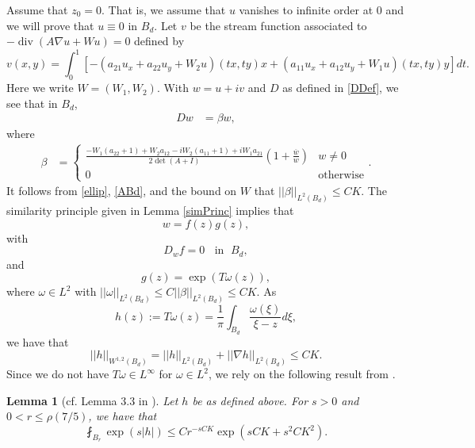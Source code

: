 \documentclass[12pt,reqno]{amsart}
\theoremstyle{plain}
\newtheorem{lem}{Lemma}
\theoremstyle{definition}
\DeclareMathOperator{\di}{div}
\newcommand{\be}{\beta}
\newcommand{\om}{\omega}
\newcommand{\iny}{\infty}
\newcommand{\gr}{\nabla}
\newcommand{\norm}[1]{\left\vert \left\vert #1\right\vert\right\vert}
\newcommand{\brac}[1]{\left[#1\right]}
\newcommand{\pr}[1]{\left( #1 \right) }
\begin{document}
Assume that $z_0 = 0$.
That is, we assume that $u$ vanishes to infinite order at $0$ and we will prove that $u \equiv 0$ in $B_d$.
Let $v$ be the stream function associated to $-\di\pr{A \gr u + W u} = 0$ defined by
\begin{equation*}
v\pr{x,y} = \int_0^1 \brac{- \pr{a_{21} u_x + a_{22} u_y + W_2 u}\pr{tx,ty} x + \pr{a_{11} u_x + a_{12} u_y + W_1 u }\pr{tx,ty}y} dt. 
\end{equation*}
Here we write $W=(W_1,W_2)$. With $w = u + i v$ and $D$ as defined in \eqref{DDef}, we see that in $B_d$,
\begin{align*}
D w &= \be w,
\end{align*}
where
\begin{align*}
\be  &= \left\{\begin{array}{ll}
\frac{- W_{1} \pr{a_{22}  + 1} + W_{2} a_{12} - i W_{2} \pr{a_{11} + 1} +  i W_{1} a_{21}}{ 2\det\pr{A + I}}\pr{1 + \frac{\overline w}{w}} & w \ne 0 \\
0 & \text{otherwise} \end{array}\right..
\end{align*}
It follows from \eqref{ellip}, \eqref{ABd}, and the bound on $W$ that $\norm{\be}_{L^2\pr{B_d}} \le C K$.
The similarity principle given in Lemma \ref{simPrinc} implies that 
$$w = f\pr{z} g\pr{z},$$
with
$$D_{w} f = 0 \;\; \text{ in } \; B_d,$$
and 
$$g\pr{z} = \exp\pr{T \om\pr{z}},$$
where 
$\om \in L^2$ with $\norm{\om}_{L^2\pr{B_d}} \le C \norm{\be}_{L^2\pr{B_d}} \le C K$.
As
\begin{equation*}
h\pr{z} :=T \om (z)=\frac{1}{\pi}\int_{B_d}\frac{\om(\xi)}{\xi-z}d\xi,
\end{equation*}
we have that
$$\norm{h}_{W^{1,2}\pr{B_d}}=\norm{h}_{L^2\pr{B_d}}+ \norm{\gr h}_{L^2\pr{B_d}}\le CK.$$
Since we do not have $T \om \in L^\iny$ for $\om \in L^2$, we rely on the following result from \cite{KW15}.

\begin{lem}[cf. Lemma 3.3 in \cite{KW15}]
\label{lemma0701}
Let $h$ be as defined above.
For $s>0$ and $0<r\le \rho\pr{7/5}$, we have that
\begin{equation}\label{qqest}
\fint_{B_r}\exp(s|h|)\le Cr^{-sCK}\exp(sCK+s^2CK^2).
\end{equation}
\end{lem}
\end{document}
